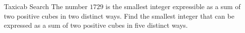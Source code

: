\begin{problem}{Taxicab Search}
    The number \(1729\) is the smallest integer expressible as a sum of two positive cubes in two distinct ways. Find the smallest integer that can be expressed as a sum of two positive cubes in five distinct ways.

    
\end{problem}
